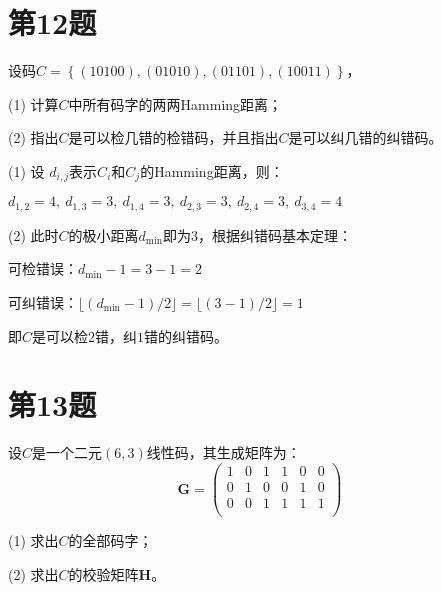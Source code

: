 \newpage
\section{第12题}

设码$C=\left\{(1 0 1 0 0), (0 1 0 1 0), (0 1 1 0 1), (1 0 0 1 1)\right\}$，

(1) 计算$C$中所有码字的两两Hamming距离；

(2) 指出$C$是可以检几错的检错码，并且指出$C$是可以纠几错的纠错码。

\begin{Solution}
    (1) 设 $d_{i,j}$表示$C_i$和$C_j$的Hamming距离，则：

    $d_{1,2} = 4,~d_{1,3} = 3,~d_{1,4} = 3,~d_{2,3} = 3,~d_{2,4} = 3,~d_{3,4} = 4$

    (2) 此时$C$的极小距离$d_{\min}$即为$3$，根据纠错码基本定理：

    可检错误：$d_{\min} - 1 = 3 - 1  = 2$

    可纠错误：$\lfloor (d_{\min} -1)/ 2\rfloor = \lfloor (3 -1)/ 2\rfloor = 1$

    即$C$是可以检$2$错，纠$1$错的纠错码。

\end{Solution}

\section{第13题}

设$C$是一个二元$(6,3)$线性码，其生成矩阵为：
\begin{equation}
    \bm{G} = \left(
        \begin{matrix}
            1 &0 &1 &1 &0 &0\\
            0 &1 &0 &0 &1 &0\\
            0 &0 &1 &1 &1 &1\\
        \end{matrix}
    \right)
\end{equation}

(1) 求出$C$的全部码字；

(2) 求出$C$的校验矩阵$\bm{H}$。

